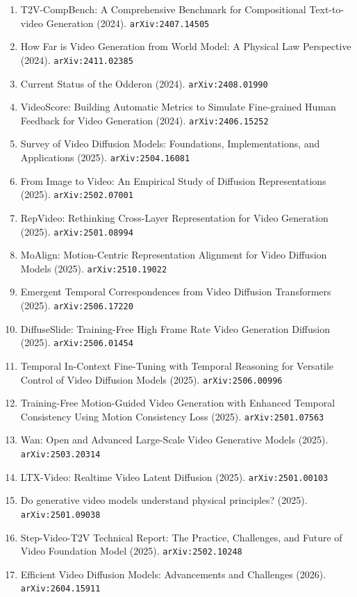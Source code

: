 \documentclass[11pt]{article}
\begin{document}
\begin{enumerate}
  \item T2V-CompBench: A Comprehensive Benchmark for Compositional Text-to-video
  Generation (2024). \texttt{arXiv:2407.14505}
  \item How Far is Video Generation from World Model: A Physical Law Perspective (2024). \texttt{arXiv:2411.02385}
  \item Current Status of the Odderon (2024). \texttt{arXiv:2408.01990}
  \item VideoScore: Building Automatic Metrics to Simulate Fine-grained Human
  Feedback for Video Generation (2024). \texttt{arXiv:2406.15252}
  \item Survey of Video Diffusion Models: Foundations, Implementations, and Applications (2025). \texttt{arXiv:2504.16081}
  \item From Image to Video: An Empirical Study of Diffusion Representations (2025). \texttt{arXiv:2502.07001}
  \item RepVideo: Rethinking Cross-Layer Representation for Video Generation (2025). \texttt{arXiv:2501.08994}
  \item MoAlign: Motion-Centric Representation Alignment for Video Diffusion Models (2025). \texttt{arXiv:2510.19022}
  \item Emergent Temporal Correspondences from Video Diffusion Transformers (2025). \texttt{arXiv:2506.17220}
  \item DiffuseSlide: Training-Free High Frame Rate Video Generation Diffusion (2025). \texttt{arXiv:2506.01454}
  \item Temporal In-Context Fine-Tuning with Temporal Reasoning for Versatile Control of Video Diffusion Models (2025). \texttt{arXiv:2506.00996}
  \item Training-Free Motion-Guided Video Generation with Enhanced Temporal
  Consistency Using Motion Consistency Loss (2025). \texttt{arXiv:2501.07563}
  \item Wan: Open and Advanced Large-Scale Video Generative Models (2025). \texttt{arXiv:2503.20314}
  \item LTX-Video: Realtime Video Latent Diffusion (2025). \texttt{arXiv:2501.00103}
  \item Do generative video models understand physical principles? (2025). \texttt{arXiv:2501.09038}
  \item Step-Video-T2V Technical Report: The Practice, Challenges, and Future of
  Video Foundation Model (2025). \texttt{arXiv:2502.10248}
  \item Efficient Video Diffusion Models: Advancements and Challenges (2026). \texttt{arXiv:2604.15911}

\end{enumerate}
\end{document}
